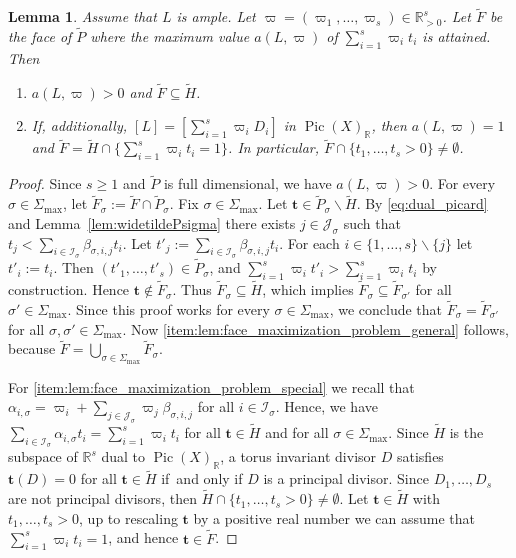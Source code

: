 \documentclass[11pt]{article}
\numberwithin{equation}{section}
\newenvironment{enumeratei}
{\bgroup\def\theenumi{\roman{enumi}}\def\theenumii{\arabic{enumii}}\begin{enumerate}}
{\end{enumerate}\egroup}
\newcommand{\bft}{\boldsymbol{t}}
\newcommand\RR{\mathbb{R}}
\newcommand{\ii}[1]{\mathcal{J}_{#1}}
\newcommand{\ic}[1]{\mathcal{I}_{#1}}
\DeclareMathOperator{\pic}{Pic}
\newtheorem{lemma}[theorem]{Lemma}
\theoremstyle{definition}
\numberwithin{theorem}{section}
\begin{document}
\begin{lemma}
\label{lem:face_maximization_problem}
Assume that $L$ is ample. Let $\varpi=(\varpi_1,\dots,\varpi_s)\in\RR^s_{>0}$.
Let $\widetilde F$ be the face of $\widetilde P$ where the maximum value
$a(L,\varpi)$ of $\sum_{i=1}^s\varpi_i t_i$ is attained.
Then
\begin{enumeratei}
\item
\label{item:lem:face_maximization_problem_general}
$a(L,\varpi)>0$ and $\widetilde F\subseteq \widetilde H$.
\item
\label{item:lem:face_maximization_problem_special}
If, additionally, $[L]=[\sum_{i=1}^s\varpi_i D_i]$ in $\pic(X)_{\RR}$, then $a(L,\varpi)=1$
and $\widetilde F=\widetilde H \cap \{\sum_{i=1}^s\varpi_i t_i=1\}$.
In particular, $\widetilde F\cap \{t_1,\dots,t_s>0\}\neq\emptyset$.
\end{enumeratei}
\end{lemma}
\begin{proof}
Since $s\geq1$ and $\widetilde P$ is full dimensional, we have $a(L,\varpi)>0$.
For every $\sigma\in\Sigma_{\max}$, let
$\widetilde F_\sigma:= \widetilde F\cap \widetilde P_\sigma$.
Fix $\sigma\in\Sigma_{\max}$.
Let $\bft\in \widetilde P_\sigma \smallsetminus \widetilde H$.
By \eqref{eq:dual_picard} and Lemma~\ref{lem:widetildePsigma}
there exists $j\in\ii{\sigma}$ such that
$t_{j}<\sum_{i\in\ic{\sigma}}\beta_{\sigma,i,j} t_i$.
Let $t'_{j}:=\sum_{i\in\ic{\sigma}}\beta_{\sigma,i,j} t_i$.
For each $i\in\{1,\dots,s\}\smallsetminus\{j\}$ let $t'_i:=t_i$.
Then $(t'_{1},\dots,t'_{s}) \in \widetilde P_\sigma$, and
$\sum_{i=1}^s\varpi_i t'_i
> \sum_{i=1}^s\varpi_i t_i $ by construction.
Hence $\bft\notin \widetilde F_\sigma$.
Thus $\widetilde F_\sigma \subseteq \widetilde H$, which implies
$\widetilde F_{\sigma} \subseteq \widetilde F_{\sigma'}$ for all $\sigma'\in\Sigma_{\max}$.
Since this proof works for every $\sigma \in \Sigma_{\max}$, we conclude that
$\widetilde F_{\sigma} = \widetilde F_{\sigma'}$ for all $\sigma, \sigma'\in\Sigma_{\max}$.
Now \eqref{item:lem:face_maximization_problem_general} follows, because
$\widetilde F=\bigcup_{\sigma\in\Sigma_{\max}}\widetilde F_\sigma$.

For \eqref{item:lem:face_maximization_problem_special} we recall that
$\alpha_{i,\sigma}=\varpi_i+\sum_{j\in\ii{\sigma}}\varpi_j\beta_{\sigma,i,j}$
for all $i\in\ic{\sigma}$. Hence, we have
$\sum_{i\in\ic{\sigma}}\alpha_{i,\sigma}t_i=\sum_{i=1}^s\varpi_i t_i$
for all $\bft\in \widetilde H$ and for all $\sigma\in\Sigma_{\max}$.
Since $\widetilde H$ is the subspace of $\RR^s$ dual to $\pic(X)_{\RR}$,
a torus invariant divisor $D$ satisfies $\bft(D)=0$ for all $\bft\in\widetilde H$
if~and only if $D$ is a principal divisor. Since $D_1,\dots, D_s$ are not principal divisors, then
$\widetilde H \cap \{t_1,\dots,t_s>0\}\neq\emptyset$.
Let $\bft \in \widetilde H$ with $t_1,\dots,t_s>0$,
up to rescaling $\bft$ by a positive real number we can assume that
$\sum_{i=1}^s\varpi_i t_i=1$, and hence $\bft\in\widetilde F$.
\end{proof}
\end{document}
